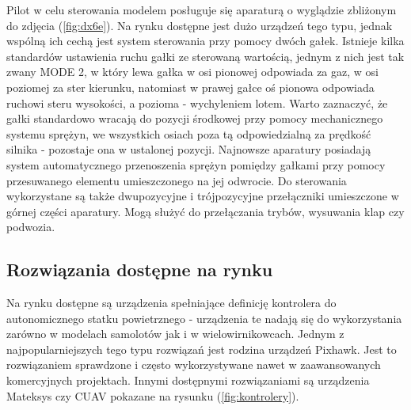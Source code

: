 \documentclass[12pt, a4paper]{article}
\let\oldref\ref
\renewcommand{\ref}[1]{(\oldref{#1})}
\begin{document}
Pilot w celu sterowania modelem posługuje się aparaturą o wyglądzie zbliżonym do zdjęcia \ref{fig:dx6e}. Na rynku dostępne jest dużo urządzeń tego typu, jednak wspólną ich cechą jest system sterowania przy pomocy dwóch gałek. Istnieje kilka standardów ustawienia ruchu gałki ze sterowaną wartością, jednym z nich jest tak zwany MODE 2, w który lewa gałka w osi pionowej odpowiada za gaz, w osi poziomej za ster kierunku, natomiast w prawej gałce oś pionowa odpowiada ruchowi steru wysokości, a pozioma - wychyleniem lotem. Warto zaznaczyć, że gałki standardowo wracają do pozycji środkowej przy pomocy mechanicznego systemu sprężyn, we wszystkich osiach poza tą odpowiedzialną za prędkość silnika - pozostaje ona w ustalonej pozycji. Najnowsze aparatury posiadają system automatycznego przenoszenia sprężyn pomiędzy gałkami przy pomocy przesuwanego elementu umieszczonego na jej odwrocie. Do sterowania wykorzystane są także dwupozycyjne i trójpozycyjne przełączniki umieszczone w górnej części aparatury. Mogą służyć do przełączania trybów, wysuwania klap czy podwozia.

\FloatBarrier
 
\subsection{Rozwiązania dostępne na rynku}
Na rynku dostępne są urządzenia spełniające definicję kontrolera do autonomicznego statku powietrznego - urządzenia te nadają się do wykorzystania zarówno w modelach samolotów jak i w wielowirnikowcach. Jednym z najpopularniejszych tego typu rozwiązań jest rodzina urządzeń Pixhawk. Jest to rozwiązaniem sprawdzone i często wykorzystywane nawet w zaawansowanych komercyjnych projektach. Innymi dostępnymi rozwiązaniami są urządzenia Mateksys czy CUAV pokazane na rysunku \ref{fig:kontrolery}.
\end{document}
